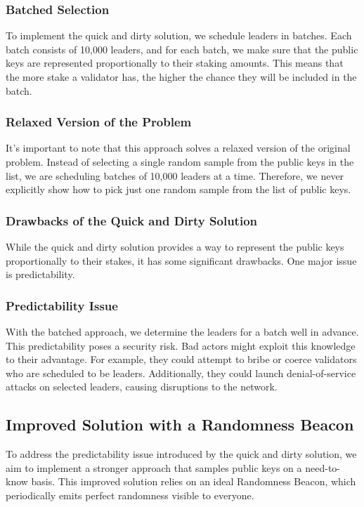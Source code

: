 \subsubsection{Batched Selection}
To implement the quick and dirty solution, we schedule leaders in batches. Each batch consists of 10,000 leaders, and for each batch, we make sure that the public keys are represented proportionally to their staking amounts. This means that the more stake a validator has, the higher the chance they will be included in the batch.

\subsubsection{Relaxed Version of the Problem}
It's important to note that this approach solves a relaxed version of the original problem. Instead of selecting a single random sample from the public keys in the list, we are scheduling batches of 10,000 leaders at a time. Therefore, we never explicitly show how to pick just one random sample from the list of public keys.

\subsubsection{Drawbacks of the Quick and Dirty Solution}
While the quick and dirty solution provides a way to represent the public keys proportionally to their stakes, it has some significant drawbacks. One major issue is predictability.

\subsubsection{Predictability Issue}
With the batched approach, we determine the leaders for a batch well in advance. This predictability poses a security risk. Bad actors might exploit this knowledge to their advantage. For example, they could attempt to bribe or coerce validators who are scheduled to be leaders. Additionally, they could launch denial-of-service attacks on selected leaders, causing disruptions to the network.

\subsection{Improved Solution with a Randomness Beacon}
To address the predictability issue introduced by the quick and dirty solution, we aim to implement a stronger approach that samples public keys on a need-to-know basis. This improved solution relies on an ideal Randomness Beacon, which periodically emits perfect randomness visible to everyone.

